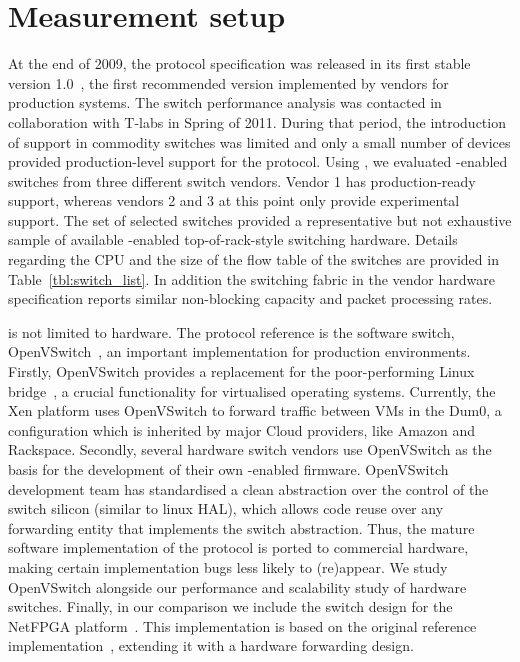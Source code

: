 \section{Measurement setup}\label{sec:oflops-switches}


At the end of 2009, the \of protocol specification was released in its first
stable version 1.0~\cite{openflow-spec}, the first recommended version
implemented by vendors for production systems.  The switch performance analysis
was contacted in collaboration with T-labs in Spring of 2011. During that
period, the introduction of \of support in commodity switches was limited and
only a small number of devices provided production-level support for the
protocol.  Using \oflops, we evaluated \of-enabled switches from three different
switch vendors.  Vendor 1 has production-ready \of support, whereas vendors 2
and 3 at this point only provide experimental \of support.  The set of selected
switches provided a representative but not exhaustive sample of available
\of-enabled top-of-rack-style switching hardware. Details regarding the CPU and
the size of the flow table of the switches are provided in
Table~\ref{tbl:switch_list}. In addition the switching fabric in the vendor
hardware specification reports similar non-blocking capacity and packet
processing rates. 

\of is not limited to hardware. The \of protocol reference is the software
switch, OpenVSwitch~\cite{openvswitch}, an important implementation for
production environments. Firstly, OpenVSwitch provides a replacement for the
poor-performing Linux bridge~\cite{bianco10}, a crucial functionality for
virtualised operating systems.  Currently, the Xen platform uses OpenVSwitch to
forward traffic between VMs in the Dum0, a configuration which is inherited by
major Cloud providers, like Amazon and Rackspace.  Secondly, several hardware
switch vendors use OpenVSwitch as the basis for the development of their own
\of-enabled firmware.  OpenVSwitch development team has standardised a clean
abstraction over the control of the switch silicon (similar to linux HAL), which
allows code reuse over any forwarding entity that implements the switch
abstraction. Thus, the mature software implementation of the \of protocol is
ported to commercial hardware, making certain implementation bugs less likely to
(re)appear.  We study OpenVSwitch alongside our performance and scalability
study of hardware switches. Finally, in our comparison we include the \of switch
design for the NetFPGA platform~\cite{openflow-netfpga}. This implementation is
based on the original \of reference implementation~\cite{of-reference-impl}, 
extending it with a hardware forwarding design. 

